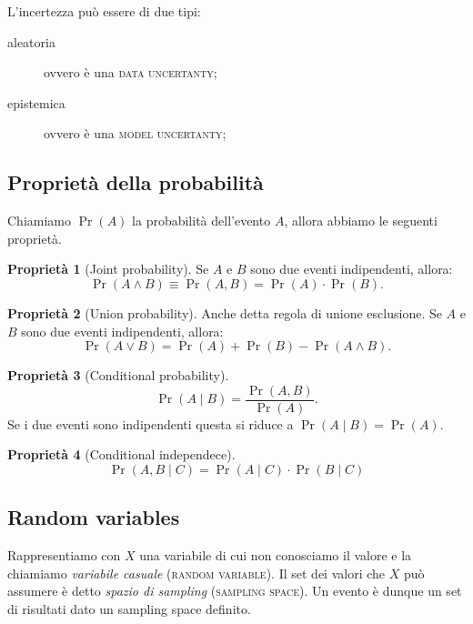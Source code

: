 \documentclass[10pt]{article}
\DeclareMathOperator{\pr}{Pr}
\newcommand{\im}[1]{\textsc{#1}}
\newcommand{\et}{\wedge}
\newcommand{\orr}{\vee}
\newcommand{\cond}{\mid}
\newcommand{\pare}[1]{
	\ensuremath{\left(#1\right)}
}
\theoremstyle{definition}
\newtheorem{property}{Proprietà}[subsection]
\begin{document}
L'incertezza può essere di due tipi:
\begin{description}
\item[aleatoria] ovvero è una \im{data uncertanty};
\item[epistemica] ovvero è una \im{model uncertanty};
\end{description}

\subsection{Proprietà della probabilità}
Chiamiamo $\pr(A)$ la probabilità dell'evento $A$, allora abbiamo le seguenti proprietà.

\begin{property}[Joint probability]
Se $A$ e $B$ sono due eventi indipendenti, allora:
\begin{equation}
\pr\pare{A\et B} \equiv \pr\pare{A, B} = \pr\pare{A} \cdot \pr\pare{B}.
\end{equation}
\end{property}

\begin{property}[Union probability]
Anche detta regola di unione esclusione. Se $A$ e $B$ sono due eventi indipendenti, allora:
\begin{equation}
\pr\pare{A\orr B} = \pr\pare{A} + \pr\pare{B} - \pr\pare{A\et B}.
\end{equation}
\end{property}

\begin{property}[Conditional probability]
\begin{equation}
\pr\pare{A\cond B} = \frac{\pr\pare{A, B}}{\pr\pare{A}}.
\end{equation}
Se i due eventi sono indipendenti questa si riduce a $\pr\pare{A\cond B} = \pr\pare{A}$.
\end{property}

\begin{property}[Conditional independece]
\begin{equation}
\pr\pare{A, B \cond C} = \pr\pare{A\cond C} \cdot \pr\pare{B\cond C}
\end{equation}
\end{property}

\subsection{Random variables}
Rappresentiamo con $X$ una variabile di cui non conosciamo il valore e la
chiamiamo \textit{variabile casuale} (\im{random variable}). Il set dei valori
che $X$ può assumere è detto \textit{spazio di sampling} (\im{sampling space}).
Un evento è dunque un set di risultati dato un sampling space definito.
\end{document}
